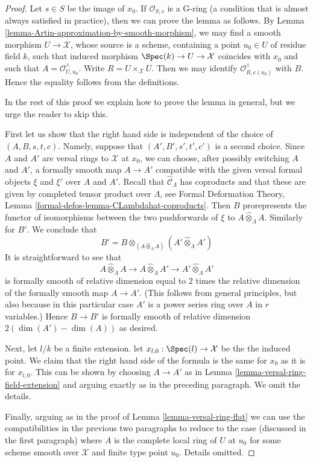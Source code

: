 \begin{proof}
Let $s \in S$ be the image of $x_0$. If $\mathcal{O}_{S, s}$
is a G-ring (a condition that is almost always satisfied in practice),
then we can prove the lemma as follows.
By Lemma \ref{lemma-Artin-approximation-by-smooth-morphism},
we may find a smooth morphism $U \to \mathcal{X}$, whose source is a scheme,
containing a point $u_0 \in U$ of residue field $k$, such that induced
morphism $\Spec(k) \to U \to \mathcal{X}$ coincides with $x_0$
and such that $A = \mathcal{O}_{U, u_0}^\wedge$.
Write $R = U \times_\mathcal{X} U$. Then we may identify
$\mathcal{O}_{R, e(u_0)}^\wedge$ with $B$.
Hence the equality follows from the definitions.

\medskip\noindent
In the rest of this proof we explain how to prove the lemma in
general, but we urge the reader to skip this.

\medskip\noindent
First let us show that the right hand side is independent of the choice
of $(A, B, s, t, c)$. Namely, suppose that $(A', B', s', t', c')$
is a second choice. Since $A$ and $A'$ are versal rings to $\mathcal{X}$
at $x_0$, we can choose, after possibly switching $A$ and $A'$,
a formally smooth map $A \to A'$ compatible with the given versal
formal objects $\xi$ and $\xi'$ over $A$ and $A'$.
Recall that $\widehat{\mathcal{C}}_\Lambda$ has
coproducts and that these are given by completed tensor product
over $\Lambda$, see Formal Deformation Theory, Lemma
\ref{formal-defos-lemma-CLambdahat-coproducts}.
Then $B$ prorepresents the functor of isomorphisms between the
two pushforwards of $\xi$ to $A \widehat{\otimes}_\Lambda A$.
Similarly for $B'$. We conclude that
$$
B' =
B \otimes_{(A \widehat{\otimes}_\Lambda A)}
(A' \widehat{\otimes}_\Lambda A')
$$
It is straightforward to see that
$$
A \widehat{\otimes}_\Lambda A \longrightarrow
A \widehat{\otimes}_\Lambda A' \longrightarrow
A' \widehat{\otimes}_\Lambda A'
$$
is formally smooth of relative dimension equal to $2$ times the
relative dimension of the formally smooth map $A \to A'$.
(This follows from general principles, but also because
in this particular case $A'$ is a power series ring over $A$
in $r$ variables.) Hence $B \to B'$ is formally smooth of
relative dimension $2(\dim(A') - \dim(A))$ as desired.

\medskip\noindent
Next, let $l/k$ be a finite extension. let
$x_{l, 0} : \Spec(l) \to \mathcal{X}$ be the
the induced point. We claim that the right hand side of the formula
is the same for $x_0$ as it is for $x_{l, 0}$.
This can be shown by choosing $A \to A'$ as in
Lemma \ref{lemma-versal-ring-field-extension}
and arguing exactly as in the preceding paragraph.
We omit the details.

\medskip\noindent
Finally, arguing as in the proof of Lemma \ref{lemma-versal-ring-flat}
we can use the compatibilities in the previous two paragraphs
to reduce to the case (discussed in the first paragraph)
where $A$ is the complete local ring of $U$ at $u_0$ for some
scheme smooth over $\mathcal{X}$ and finite type point $u_0$.
Details omitted.
\end{proof}












